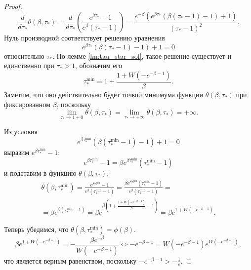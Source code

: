 \begin{proof}
	\begin{equation*}
		\frac{d}{d\tau_*} \theta(\beta, \tau_*) = \frac{d}{d\tau_*} \left( \frac{e^{\beta\tau_*} - 1}{e^{\beta}(\tau_* - 1)} \right) = \frac{e^{-\beta}\left(e^{\beta \tau_*}(\beta(\tau_* - 1) - 1) + 1\right)}{(\tau_* - 1)^2}.
	\end{equation*}
	Нуль производной соответствует решению уравнения
	\begin{equation*}
		e^{\beta \tau_*}(\beta(\tau_* - 1) - 1) + 1 = 0
	\end{equation*}
	относительно $\tau_*$. По лемме \ref{lm:tau_star_sol}, такое решение существует и единственно при $\tau_* > 1$, обозначим его
	\begin{equation*}
		\tau_*^{\min} = 1 + \frac{1 + W(-e^{-\beta - 1})}{\beta}.
	\end{equation*}
	Заметим, что оно действительно будет точкой минимума функции $ \theta(\beta, \tau_*)$ при фиксированном $\beta$, поскольку
	\begin{equation*}
		\lim\limits_{\tau_* \to 1 + 0} \theta(\beta, \tau_*) = \lim\limits_{\tau_* \to +\infty} \theta(\beta, \tau_*) = +\infty. 
	\end{equation*}
	
	Из условия
	\begin{equation*}
		e^{\beta \tau_*^{\min}}(\beta(\tau_*^{\min} - 1) - 1) + 1 = 0
	\end{equation*}
	выразим $e^{\beta \tau_*^{\min}} - 1$:
	\begin{equation*}
		e^{\beta \tau_*^{\min}} - 1 = \beta e^{\beta \tau_*^{\min}} (\tau_*^{\min} - 1)
	\end{equation*}
	и подставим в функцию $\theta(\beta, \tau_*)$:
	\begin{multline}
		\theta(\beta, \tau_*^{\min}) = \frac{e^{\beta\tau_*^{\min}} - 1}{e^{\beta}(\tau_*^{\min} - 1)} = \frac{\beta e^{\beta \tau_*^{\min}} (\tau_*^{\min} - 1)}{e^{\beta}(\tau_*^{\min} - 1)} =\\= \beta e^{\beta (\tau_*^{\min} - 1)} = \beta e^{\beta(1 + \frac{1 + W(-e^{-\beta - 1})}{\beta} - 1)} = \beta e^{1 + W(-e^{-\beta - 1})}. 
	\end{multline}
	
	Теперь убедимся, что $\theta(\beta, \tau_*^{\min}) = \phi(\beta)$.
	\begin{equation*}
		\beta e^{1 + W(-e^{-\beta - 1})} = -\frac{\beta e^{-\beta}}{W(-e^{-\beta - 1})} \Leftrightarrow -e^{-\beta - 1} = W(-e^{-\beta - 1}) e^{W(-e^{-\beta - 1})},
	\end{equation*}
	что является верным равенством, поскольку $-e^{-\beta - 1} > -\frac{1}{e}$.
\end{proof}


